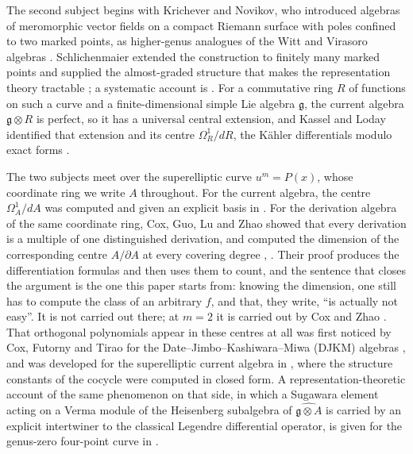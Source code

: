 \documentclass[11pt]{amsart}
\theoremstyle{definition}
\theoremstyle{remark}
\newcommand{\g}{\mathfrak{g}}
\begin{document}
The second subject begins with Krichever and Novikov, who introduced algebras
of meromorphic vector fields on a compact Riemann surface with poles confined
to two marked points, as higher-genus analogues of the Witt and Virasoro
algebras \cite{KrichNovikov1987}. Schlichenmaier extended the construction to
finitely many marked points and supplied the almost-graded structure that makes
the representation theory tractable
\cite{Schlichenmaier1990a,Schlichenmaier1990b,Schlichenmaier2003}; a systematic
account is \cite{Schlichenmaier2014}. For a commutative ring $R$ of functions on
such a curve and a finite-dimensional simple Lie algebra $\g$, the current
algebra $\g\otimes R$ is perfect, so it has a
universal central extension, and Kassel and Loday identified that extension and
its centre $\Omega^1_R/dR$, the K\"ahler differentials modulo exact forms
\cite{KasselLoday1982}.

The two subjects meet over the superelliptic curve $u^m=P(x)$, whose coordinate
ring we write $A$ throughout. For the current
algebra, the centre $\Omega^1_A/dA$ was computed and given an explicit basis in
\cite[Theorem~2.4]{Santos2022}. For the derivation algebra of the same
coordinate ring, Cox, Guo, Lu and Zhao showed that every derivation is a
multiple of one distinguished derivation, and computed the dimension of the
corresponding centre $A/\partial A$ at every covering degree
\cite[Lemma~3]{CoxGuoLuZhao2017}, \cite[Theorem~9]{CoxGuoLuZhao2017}. Their
proof produces the differentiation formulas
\cite[(3.1)--(3.2)]{CoxGuoLuZhao2017} and then uses them to count, and the
sentence that closes the argument is the one this paper starts from: knowing the
dimension, one still has to compute the class of an arbitrary $f$, and that,
they write, ``is actually not easy''. It is not carried out there; at $m=2$ it is
carried out by Cox and Zhao \cite{CoxZhao2018}. That orthogonal polynomials appear in these
centres at all was first noticed by Cox, Futorny and Tirao for the
Date--Jimbo--Kashiwara--Miwa (DJKM) algebras \cite{CoxFutornyTirao2013}, and was developed for the superelliptic
current algebra in \cite{SantosNeklyudovFutorny2025}, where the structure
constants of the cocycle were computed in closed form. A representation-theoretic
account of the same phenomenon on that side, in which a Sugawara element acting
on a Verma module of the Heisenberg subalgebra of $\widehat{\g\otimes A}$ is
carried by an explicit intertwiner to the classical Legendre differential
operator, is given for the genus-zero four-point curve in
\cite{P4_RepMechanism}.
\end{document}
